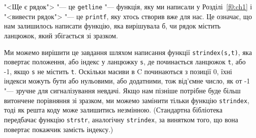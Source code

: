 \documentclass[a4paper,12pt]{book}
\begin{document}
  "<Ще є рядок"> "--- це \texttt{getline} "--- функція, яку ми написали у
  Розділі~\ref{f0:ch1} і "<вивести рядок"> "--- це \texttt{printf},
  яку хтось створив вже для нас. Це означає, що нам залишилось написати функцію, яка
  вирішувала б, чи рядок містить ланцюжок, який збігається зі зразком.

  Ми можемо вирішити це завдання шляхом написання функції \texttt{strindex(s,t)}, яка
  повертає положення, або індекс у ланцюжку \texttt{s}, де починається ланцюжок
  \texttt{t}, або -1, якщо \texttt{s} не містить \texttt{t}. Оскільки масиви в C
  починаються з позиції 0, їхні індекси можуть бути або нульовими, або додатними, тож
  від'ємне число, як от -1 "--- зручне для сигналізування невдачі. Якщо нам пізніше
  потрібне буде більш витончене порівняння зі зразком, ми можемо замінити тільки функцію
  \texttt{strindex}, тоді як решта коду може залишитись незмінною. (Стандартна бібліотека
  передбачає функцію \texttt{strstr}, аналогічну \texttt{strindex}, за винятком того, що
  вона повертає покажчик замість індексу.)
\end{document}
